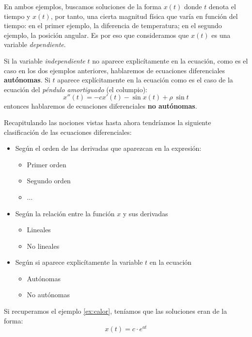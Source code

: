 En ambos ejemplos, buscamos soluciones de la forma $x(t)$ donde $t$ denota el tiempo y $x(t)$, por tanto, una cierta magnitud física que varía en función del tiempo: en el primer ejemplo, la diferencia de temperatura; en el segundo ejemplo, la posición angular. Es por eso que consideramos que $x(t)$ es una variable \emph{dependiente}.


\begin{definition}
Si la variable \emph{independiente} $t$ no aparece explicítamente en la ecuación, como es el caso en los dos ejemplos anteriores, hablaremos de ecuaciones diferenciales \textbf{autónomas}. Si $t$ aparece explícitamente en la ecuación como es el caso de la ecuación del \emph{péndulo amortiguado} (el columpio):
\begin{equation}
x''(t) = -cx'(t)-\sin x(t)+\rho~\sin t
\end{equation}
entonces hablaremos de ecuaciones diferenciales \textbf{no autónomas}.
\end{definition}

Recapitulando las nociones vistas hasta ahora tendríamos la siguiente clasificación de las ecuaciones diferenciales:

\begin{itemize}
\item Según el orden de las derivadas que aparezcan en la expresión:
	\begin{itemize}
	\item Primer orden
	\item Segundo orden
	\item ...
	\end{itemize}
\item Según la relación entre la función $x$ y sus derivadas
	\begin{itemize}
	\item Lineales
	\item No lineales
	\end{itemize}
\item Según si aparece explicítamente la variable $t$ en la ecuación
	\begin{itemize}
	\item Autónomas
	\item No autónomas
	\end{itemize}
\end{itemize}

Si recuperamos el ejemplo \ref{ex:calor}, teníamos que las soluciones eran de la forma:
\begin{equation}
x(t) = c \cdot e^{at}
\end{equation}

